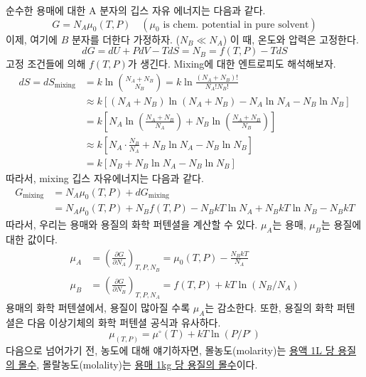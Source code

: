 \documentclass{article}
\begin{document}
순수한 용매에 대한 A 분자의 깁스 자유 에너지는 다음과 같다.
\begin{equation}
    G = N_A \mu_0 (T,P) \quad (\mu_0 \text{ is chem. potential in pure solvent})
\end{equation}
이제, 여기에 $B$ 분자를 더한다 가정하자. ($N_B \ll N_A$) 이 때, 온도와 압력은 고정한다.
\begin{equation}
    dG = dU + PdV - TdS = N_B = f(T,P) -TdS
\end{equation}
고정 조건들에 의해 $f(T,P)$가 생긴다. Mixing에 대한 엔트로피도 해석해보자.
\begin{align}
    dS = dS_{\text{mixing}} &= k \ln \binom{N_A + N_B}{N_B} = k \ln \frac{(N_A + N_B)!}{N_A ! N_B !}\\
    &\approx k [ (N_A + N_B) \ln (N_A + N_B) - N_A \ln N_A - N_B \ln N_B]\\
    &= k \left[ N_A \ln \left( \frac{N_A + N_B}{N_A} \right) + N_B \ln \left( \frac{N_A + N_B}{N_B} \right) \right]\\
    &\approx k \left[ N_A \cdot \frac{N_B}{N_A} + N_B \ln N_A - N_B \ln N_B \right]\\
    &= k [N_B + N_B \ln N_A - N_B \ln N_B]
\end{align}
따라서, mixing 깁스 자유에너지는 다음과 같다.
\begin{align}
    G_{\text{mixing}} &= N_A \mu_0 (T,P) + dG_{\text{mixing}}\\
    &= N_A \mu_0 (T,P) + N_B f(T,P) - N_B kT \ln N_A + N_B kT \ln N_B - N_B kT
\end{align}
따라서, 우리는 용매와 용질의 화학 퍼텐셜을 계산할 수 있다. $\mu_A$는 용매, $\mu_B$는 용질에 대한 값이다.
\begin{align} \label{eq:5-10}
    \mu_A &= \left( \frac{\partial G}{\partial N_A} \right)_{T,P,N_B} = \mu_0 (T,P) - \frac{N_B kT}{N_A}\\
    \mu_B &= \left( \frac{\partial G}{\partial N_B} \right)_{T,P,N_A} = f(T,P) + kT \ln (N_B / N_A)
\end{align}
용매의 화학 퍼텐셜에서, 용질이 많아질 수록 $\mu_A$는 감소한다. 또한, 용질의 화학 퍼텐셜은 다음 이상기체의 화학 퍼텐셜 공식과 유사하다.
\begin{equation}
    \mu_(T,P) = \mu^\circ (T) + kT \ln (P/P^\circ)
\end{equation}
다음으로 넘어가기 전, 농도에 대해 얘기하자면, 몰농도(molarity)는 \underline{용액 1L 당 용질의 몰수}, 몰랄농도(molality)는 \underline{용매 1kg 당 용질의 몰수}이다.

\newpage
\end{document}
